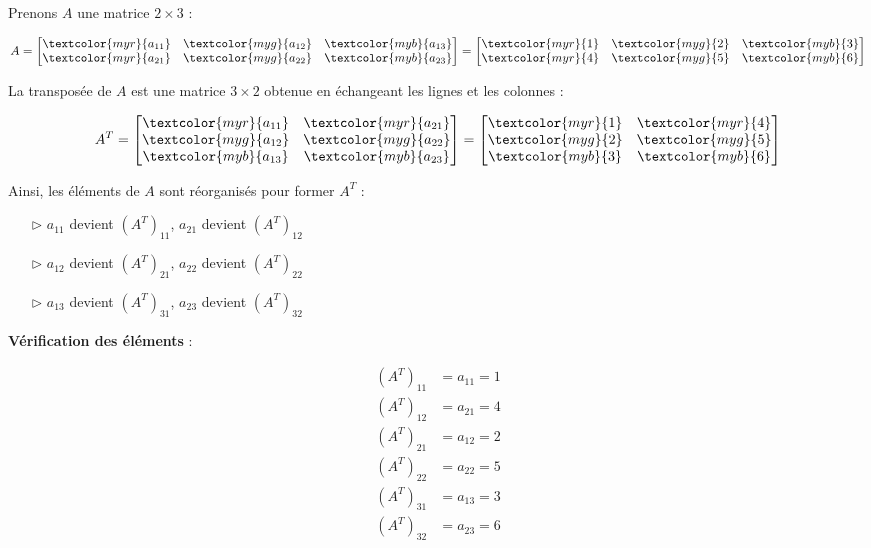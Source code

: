 \documentclass{report}
\begin{document}
\begin{multicols*}{2}
Prenons $A$ une matrice $2 \times 3$ :

\begin{align*}
    A = \begin{bmatrix}
        \textcolor{myr}{a_{11}} & \textcolor{myg}{a_{12}} & \textcolor{myb}{a_{13}} \\
        \textcolor{myr}{a_{21}} & \textcolor{myg}{a_{22}} & \textcolor{myb}{a_{23}}
    \end{bmatrix}
    = \begin{bmatrix}
        \textcolor{myr}{1} & \textcolor{myg}{2} & \textcolor{myb}{3} \\
        \textcolor{myr}{4} & \textcolor{myg}{5} & \textcolor{myb}{6}
    \end{bmatrix}
\end{align*}

La transposée de $A$ est une matrice $3 \times 2$ obtenue en échangeant les lignes et les
colonnes :

\begin{align*}
    A^T = \begin{bmatrix}
        \textcolor{myr}{a_{11}} & \textcolor{myr}{a_{21}} \\
        \textcolor{myg}{a_{12}} & \textcolor{myg}{a_{22}} \\
        \textcolor{myb}{a_{13}} & \textcolor{myb}{a_{23}}
    \end{bmatrix}
    = \begin{bmatrix}
        \textcolor{myr}{1} & \textcolor{myr}{4} \\
        \textcolor{myg}{2} & \textcolor{myg}{5} \\
        \textcolor{myb}{3} & \textcolor{myb}{6}
    \end{bmatrix}
\end{align*}

Ainsi, les éléments de $A$ sont réorganisés pour former $A^T$ :

\begin{itemize}
    \item[$\rhd$ ] $a_{11}$ devient $(A^T)_{11}$, $a_{21}$ devient $(A^T)_{12}$
    \item[$\rhd$ ] $a_{12}$ devient $(A^T)_{21}$, $a_{22}$ devient $(A^T)_{22}$
    \item[$\rhd$ ] $a_{13}$ devient $(A^T)_{31}$, $a_{23}$ devient $(A^T)_{32}$
\end{itemize}

\noindent
\textbf{Vérification des éléments} :

\begin{align*}
    (A^T)_{11} &= a_{11} = 1 \\
    (A^T)_{12} &= a_{21} = 4 \\
    (A^T)_{21} &= a_{12} = 2 \\
    (A^T)_{22} &= a_{22} = 5 \\
    (A^T)_{31} &= a_{13} = 3 \\
    (A^T)_{32} &= a_{23} = 6
\end{align*}


\end{multicols*}
\end{document}
